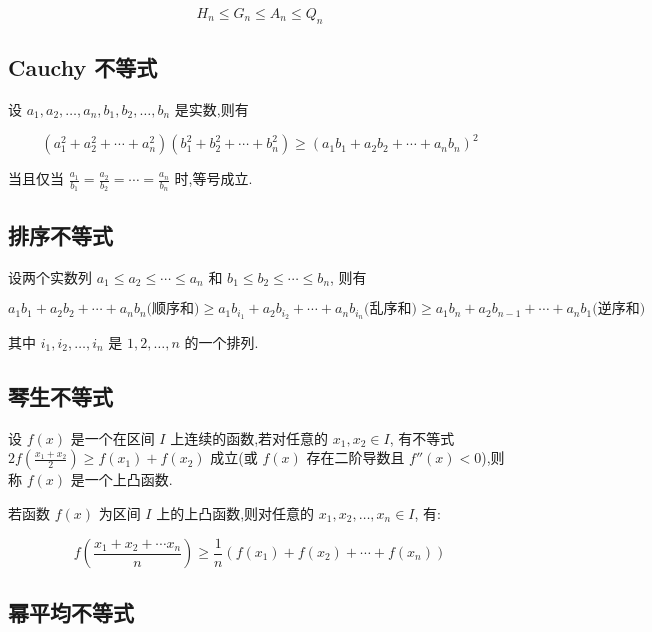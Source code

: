 \documentclass[a4paper , final]{ctexart}
\begin{document}
\begin{equation*}
  H_n \leq G_n \leq A_n \leq Q_n
\end{equation*}

\subsection*{Cauchy 不等式}

设 $a_1,a_2,\ldots,a_n,b_1,b_2,\ldots,b_n$ 是实数,则有

\begin{equation*}
  (a_1^2+a_2^2+\cdots+a_n^2)(b_1^2+b_2^2+\cdots+b_n^2) \geq (a_1b_1+a_2b_2+\cdots+a_nb_n)^2
\end{equation*}

当且仅当 $\frac{a_1}{b_1}=\frac{a_2}{b_2}=\cdots=\frac{a_n}{b_n}$ 时,等号成立.

\subsection*{排序不等式}

设两个实数列 $a_1 \leq a_2 \leq \cdots \leq a_n$ 和 $b_1 \leq b_2 \leq \cdots \leq b_n$, 则有

\begin{equation*}
  a_1b_1 + a_2b_2 + \cdots + a_nb_n\text{(顺序和)} \geq a_1b_{i_1} + a_2b_{i_2} + \cdots + a_nb_{i_n}\text{(乱序和)} \geq a_1b_n + a_2b_{n-1} + \cdots + a_nb_1\text{(逆序和)}
\end{equation*}

其中 $i_1,i_2,\ldots,i_n$ 是 $1,2,\ldots,n$ 的一个排列.

\subsection*{琴生不等式}

设 $f(x)$ 是一个在区间 $I$ 上连续的函数,若对任意的 $x_1,x_2\in I$, 有不等式 $2f\left(\frac{x_1+x_2}{2}\right) \geq f(x_1) + f(x_2)$ 成立(或 $f(x)$ 存在二阶导数且 $f''(x)<0$),则称 $f(x)$ 是一个上凸函数.

若函数 $f(x)$ 为区间 $I$ 上的上凸函数,则对任意的 $x_1,x_2,\ldots,x_n\in I$, 有:

\begin{equation*}
  f(\frac{x_1+x_2+\cdots x_n}{n})\geq \frac{1}{n}(f(x_1)+f(x_2)+\cdots+f(x_n))
\end{equation*}

\subsection*{幂平均不等式}
\end{document}
